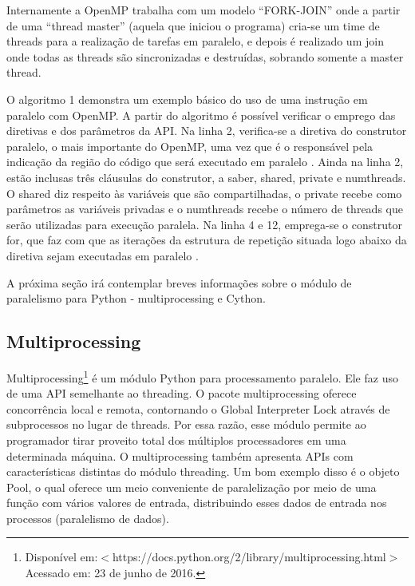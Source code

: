 \documentclass[a4paper,12pt]{article}
\begin{document}
Internamente a OpenMP trabalha com um modelo “FORK-JOIN” onde a partir de uma
“thread master” (aquela que iniciou o programa) cria-se um time de threads para a
realização de tarefas em paralelo, e depois é realizado um join onde todas as threads
são sincronizadas e destruídas, sobrando somente a master thread.

O algoritmo 1 demonstra um exemplo básico do uso de uma instrução em paralelo com OpenMP. A partir do algoritmo é possível verificar o emprego das diretivas e dos parâmetros da API. Na linha 2, verifica-se a diretiva do construtor paralelo, o mais importante do OpenMP, uma vez que é o responsável pela indicação da região do código que será executado em paralelo \cite{tutopenmp}. Ainda na linha 2, estão inclusas três cláusulas do construtor, a saber, shared, private e num\underline{\hspace{0.1cm}}threads. O shared diz respeito às variáveis que são compartilhadas, o private recebe como parâmetros as variáveis privadas e o num\underline{\hspace{0.1cm}}threads recebe o número de threads que serão utilizadas para execução paralela. Na linha 4 e 12, emprega-se o construtor for, que faz com que as iterações da estrutura de repetição situada logo abaixo da diretiva sejam executadas em paralelo \cite{tutopenmp}.    


A próxima seção irá contemplar breves informações sobre o módulo de paralelismo para Python - multiprocessing e Cython. 

\subsection{Multiprocessing}
Multiprocessing\footnote{Disponível em:$<$https://docs.python.org/2/library/multiprocessing.html$>$ Acessado em: 23 de junho de 2016.} é um módulo Python para processamento paralelo. Ele faz uso de uma API semelhante ao threading. 
O pacote multiprocessing oferece concorrência local e remota, contornando o Global Interpreter Lock através de subprocessos no lugar de threads. Por essa razão, esse módulo permite ao programador tirar proveito total dos múltiplos processadores em uma determinada máquina.
O multiprocessing também apresenta APIs com características distintas do módulo threading. Um bom exemplo disso é o objeto Pool, o qual oferece um meio conveniente de paralelização por meio de uma função com vários valores de entrada, distribuindo esses dados de entrada nos processos (paralelismo de dados). 
\end{document}
